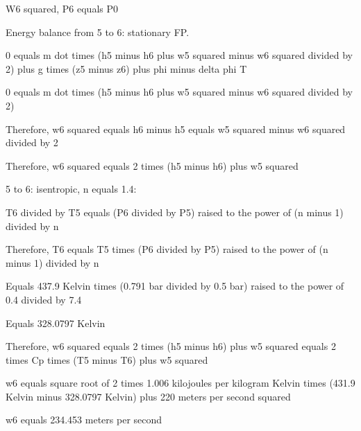 W6 squared, P6 equals P0

Energy balance from 5 to 6: stationary FP.

0 equals m dot times (h5 minus h6 plus w5 squared minus w6 squared divided by 2) plus g times (z5 minus z6) plus phi minus delta phi T

0 equals m dot times (h5 minus h6 plus w5 squared minus w6 squared divided by 2)

Therefore, w6 squared equals h6 minus h5 equals w5 squared minus w6 squared divided by 2

Therefore, w6 squared equals 2 times (h5 minus h6) plus w5 squared

5 to 6: isentropic, n equals 1.4:

T6 divided by T5 equals (P6 divided by P5) raised to the power of (n minus 1) divided by n

Therefore, T6 equals T5 times (P6 divided by P5) raised to the power of (n minus 1) divided by n

Equals 437.9 Kelvin times (0.791 bar divided by 0.5 bar) raised to the power of 0.4 divided by 7.4

Equals 328.0797 Kelvin

Therefore, w6 squared equals 2 times (h5 minus h6) plus w5 squared equals 2 times Cp times (T5 minus T6) plus w5 squared

w6 equals square root of 2 times 1.006 kilojoules per kilogram Kelvin times (431.9 Kelvin minus 328.0797 Kelvin) plus 220 meters per second squared

w6 equals 234.453 meters per second